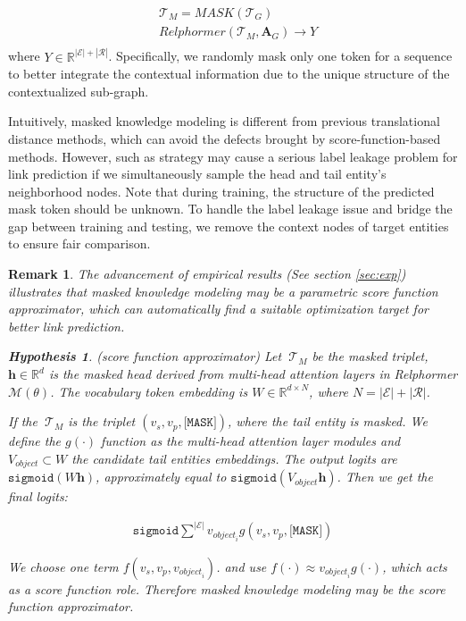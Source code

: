 \documentclass[sigconf]{acmart}
\newtheorem{remark}{\noindent \textbf{Remark}}
\newtheorem{proof_}{\noindent \textbf{Hypothesis}}
\begin{document}
\begin{equation}
\begin{aligned}
    & \mathcal{T}_{M} =MASK(\mathcal{T}_{G}) \\
    & {Relphormer}(\mathcal{T}_{M}, {\mathbf{A}_{G}}) \to {Y}\\
\end{aligned}
\end{equation}
where $Y \in \mathbb{R}^{ \left |  \mathcal{E}  \right | + \left |  \mathcal{R}  \right | }$.
Specifically, we randomly mask only one token for a sequence to better integrate the contextual information due to the unique structure of the contextualized sub-graph.

Intuitively, masked knowledge modeling is different from previous translational distance methods, which can avoid the defects brought by score-function-based methods.
However, such as strategy may cause a serious label leakage problem for link prediction if we simultaneously sample the head and tail entity's neighborhood nodes.
Note that during training, the structure of the predicted mask token should be unknown.
To handle the label leakage issue and bridge the gap between training and testing, we {remove the context nodes of target entities to ensure fair comparison}.

\begin{remark}
The advancement of empirical results (See section \ref{sec:exp}) illustrates that masked knowledge modeling may be a parametric score function approximator, which can automatically find a suitable optimization target for better link prediction.


\begin{proof_}
(score function approximator) Let $~\mathcal{T}_{M} $ be the masked triplet, $\textbf{h}  \in  \mathbb{R}^d $ is the masked head derived from multi-head attention layers in Relphormer $\mathcal{M}(\theta)$. 
The vocabulary token embedding is $ W  \in \mathbb{R}^{d \times N} $, where $ N = \left |  \mathcal{E}  \right | + \left |  \mathcal{R}  \right |$. 

If the $~\mathcal{T}_{M}$ is the triplet $(v_{s}, v_{p}, \texttt{[MASK]})$, where the tail entity is masked.
We define the $g(\cdot)$ function as the multi-head attention layer modules and $V_{object} \subset W $ the candidate tail entities embeddings. The output logits are $ \texttt{sigmoid}(W \textbf{h})$, approximately equal to $\texttt{sigmoid}(V_{object} \textbf{h})$.
Then we get the final logits:

\begin{equation}
\begin{aligned}
    \texttt{sigmoid}\sum^{ \left | \mathcal{E} \right | }{v_{{object}_i}  g(v_{s}, v_{p}, \texttt{[MASK]})}
\end{aligned}
\end{equation}

We choose one term $ f(v_{s}, v_{p}, v_{{object}_i})  $. 
and use $f(\cdot) \approx v_{{object}_i}g(\cdot)$, which acts as a score function role.
Therefore masked knowledge modeling may be the score function approximator.
\end{proof_}
\end{remark}
\end{document}
